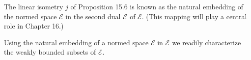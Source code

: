 The linear isometry $j$ of Proposition 15.6 is known as the natural embedding of the normed space $\mathcal{E}$ in the second dual $\mathcal{E}^{}$ of $\mathcal{E}$. (This mapping will play a central role in Chapter 16.)

Using the natural embedding of a normed space $\mathcal{E}$ in $\mathcal{E}^{}$ we readily characterize the weakly bounded subsets of $\mathcal{E}$.
